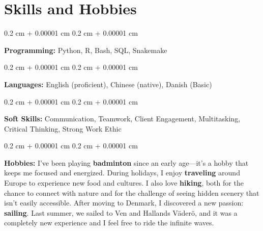 \documentclass[10pt, letterpaper]{article}
\newenvironment{onecolentry}{
    \begin{adjustwidth}{
        0.2 cm + 0.00001 cm
    }{
        0.2 cm + 0.00001 cm
    }
}{
    \end{adjustwidth}
} %
\begin{document}
    


    
    \section{Skills and Hobbies}

        \begin{onecolentry}
            \textbf{Programming:} Python, R, Bash, SQL, Snakemake
        \end{onecolentry}

        \vspace{0.2 cm}

        \begin{onecolentry}
            \textbf{Languages:} English (proficient), Chinese (native), Danish (Basic)
        \end{onecolentry}

        \vspace{0.2 cm}

        \begin{onecolentry}
            \textbf{Soft Skills:} Communication, Teamwork, Client Engagement, Multitasking, Critical Thinking, Strong Work Ethic
        \end{onecolentry}

        \vspace{0.2 cm}

        \begin{onecolentry}
            \textbf{Hobbies:} 
            I’ve been playing \textbf{badminton} since an early age—it’s a hobby that keeps me focused and energized. During holidays, I enjoy \textbf{traveling} around Europe to experience new food and cultures. I also love \textbf{hiking}, both for the chance to connect with nature and for the challenge of seeing hidden scenery that isn’t easily accessible. After moving to Denmark, I discovered a new passion: \textbf{sailing}. Last summer, we sailed to Ven and Hallands Väderö, and it was a completely new experience and  I feel free to ride the infinite waves.
        \end{onecolentry}


    
\end{document}
